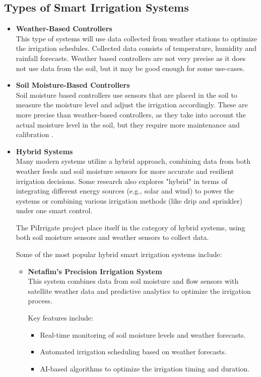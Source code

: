 \subsection{Types of Smart Irrigation Systems}
\begin{itemize}
  \item \textbf{Weather-Based Controllers} \\
  This type of systems will use data collected from weather stations to optimize the irrigation schedules.
  Collected data consists of temperature, humidity and rainfall forecasts. Weather based controllers are not
  very precise as it does not use data from the soil, but it may be good enough for some use-cases.

  \item \textbf{Soil Moisture-Based Controllers} \\
  Soil moisture based controllers use sensors that are placed in the soil to measure
  the moisture level and adjust the irrigation accordingly.
  These are more precise than weather-based controllers, as they take into account
  the actual moisture level in the soil, but they require more maintenance and calibration
  \cite{smartIrrigationTechnologyControllersAndSensors}.

  \item \textbf{Hybrid Systems} \\
  Many modern systems utilize a hybrid approach, combining data from both
  weather feeds and soil moisture sensors for more accurate and resilient 
  irrigation decisions. Some research also explores "hybrid" in terms of 
  integrating different energy sources (e.g., solar and wind) to power the systems or 
  combining various 
  irrigation methods (like drip and sprinkler) under one smart control\cite{soilBasedIrrigation}.

  The PiIrrigate project place itself in the category of hybrid systems, using both
  soil moisture sensors and weather sensors to collect data.
  
  Some of the most popular hybrid smart irrigation systems include:
  \begin{itemize}
    \item \textbf{Netafim's Precision Irrigation System} \\
    This system combines data from soil moisture and flow sensors with satellite weather data and predictive
    analytics to optimize the irrigation process.
    
    Key features include:
    \begin{itemize}
      \item Real-time monitoring of soil moisture levels and weather forecasts.
      \item Automated irrigation scheduling based on weather forecasts.
      \item AI-based algorithms to optimize the irrigation timing and duration.
    \end{itemize}


\end{itemize}
\end{itemize}
